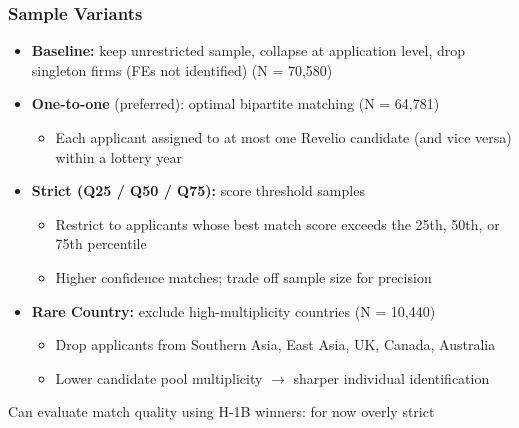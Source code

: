 \documentclass[xcolor=dvipsnames, compress, 12pt, aspectratio=169, presentation]{beamer}
\begin{document}
\begin{frame}
    \frametitle{Sample Variants}
    \begin{itemize}
        \item \textbf{Baseline:} keep unrestricted sample, collapse at application level, drop singleton firms (FEs not identified) (N = 70,580)
        \vspace{2mm}
        \item \textbf{One-to-one} \textcolor{maincolor}{(preferred):} optimal bipartite matching (N = 64,781)
        \begin{itemize}
            \item Each applicant assigned to at most one Revelio candidate (and vice versa) within a lottery year
        \end{itemize}
        \vspace{2mm}
        \item \textbf{Strict (Q25 / Q50 / Q75):} score threshold samples
        \begin{itemize}
            \item Restrict to applicants whose best match score exceeds the 25th, 50th, or 75th percentile
            \item Higher confidence matches; trade off sample size for precision
        \end{itemize}
        \vspace{2mm}
        \item \textbf{Rare Country:} exclude high-multiplicity countries (N = 10,440)
        \begin{itemize}
            \item Drop applicants from Southern Asia, East Asia, UK, Canada, Australia
            \item Lower candidate pool multiplicity $\rightarrow$ sharper individual identification
        \end{itemize}
    \end{itemize}
    Can evaluate match quality using H-1B winners: for now overly strict 
        \hyperlink{match_quality}{}
\end{frame}

\end{document}
